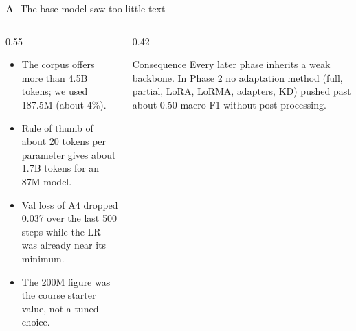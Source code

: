 \documentclass[aspectratio=169,11pt]{beamer}
\newcommand{\pb}[1]{\textbf{\textcolor{warm}{#1}}}   %
\begin{document}
\begin{frame}{\pb{A}\,\, The base model saw too little text}
  \begin{columns}[T]
    \begin{column}{0.55\textwidth}
      \footnotesize
      \begin{itemize}
        \item The corpus offers more than 4.5B tokens; we used 187.5M (about 4\%).
        \item Rule of thumb of about 20 tokens per parameter gives about 1.7B tokens for an 87M model.
        \item Val loss of A4 dropped 0.037 over the last 500 steps while the LR was already near its minimum.
        \item The 200M figure was the course starter value, not a tuned choice.
      \end{itemize}
    \end{column}
    \begin{column}{0.42\textwidth}
      \begin{alertblock}{Consequence}
        \footnotesize
        Every later phase inherits a weak backbone. In Phase 2 no adaptation method (full, partial, LoRA, LoRMA, adapters, KD) pushed past about 0.50 macro-F1 without post-processing.
      \end{alertblock}
    \end{column}
  \end{columns}
\end{frame}
\end{document}
